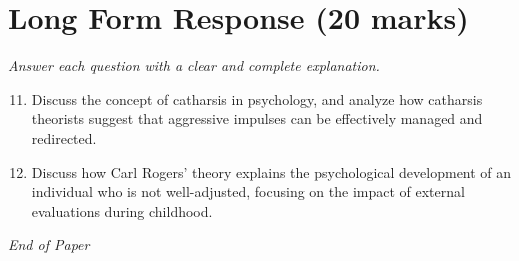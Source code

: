 \documentclass[12pt]{article}
\begin{document}
\section*{Long Form Response (20 marks)}
\textit{Answer each question with a clear and complete explanation.}
\begin{enumerate}[label=\arabic*.]
\setcounter{enumi}{10}
\item Discuss the concept of catharsis in psychology, and analyze how catharsis theorists suggest that aggressive impulses can be effectively managed and redirected.
\item Discuss how Carl Rogers' theory explains the psychological development of an individual who is not well-adjusted, focusing on the impact of external evaluations during childhood.
\end{enumerate}

\vfill
\noindent\textit{End of Paper}
\end{document}
